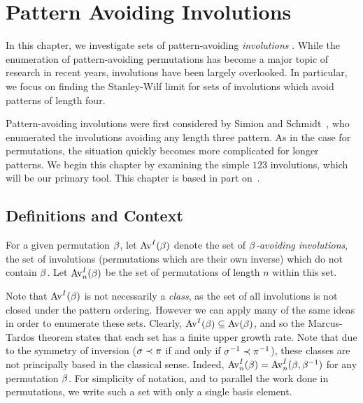 \chapter{Pattern Avoiding Involutions} 
\label{chap:involutions}

  In this chapter, we investigate sets of pattern-avoiding \emph{involutions}
  . While the enumeration of pattern-avoiding permutations
  has become a major topic of research in recent years, involutions have been
  largely overlooked.  In particular, we focus on finding the Stanley-Wilf
  limit for sets of involutions which avoid patterns of length four. 
  
  Pattern-avoiding involutions were first considered by Simion and
  Schmidt~\cite{Simion1985}, who enumerated the involutions avoiding any length 
  three pattern. As in the case for permutations, the situation quickly becomes
  more complicated for longer patterns. 
  We begin this chapter by examining the simple $123$
  involutions, which will be our primary tool. This chapter is based in part
  on~\cite{me-involutions}. 
  



  
  

\section{Definitions and Context}
\label{involutions:sec:intro}

  \begin{definition}\label{involutions:def:invclass}
    For a given permutation $\beta$, let $\operatorname{{Av}}^I(\beta)$ denote the set of
    \emph{$\beta$-avoiding involutions}, the set of involutions (permutations
    which are their own inverse) which do not contain $\beta$. 
    Let $\operatorname{{Av}}_n^I (\beta)$ be the set of permutations of length $n$ within this set. 
  \end{definition}

  Note that $\operatorname{{Av}}^I(\beta)$ is not necessarily a \emph{class}, as the set of all
  involutions is not closed under the pattern ordering. However we can apply
  many of the same ideas in order to enumerate these sets.  Clearly, $\operatorname{{Av}}^I
  (\beta) \subseteq \operatorname{{Av}}(\beta)$, and so the Marcus-Tardos theorem states that
  each set has a finite upper growth rate. Note that due to the symmetry of
  inversion ($\sigma \prec \pi$ if and only if $\sigma^{-1} \prec \pi^{-1}$), these
  classes are not principally based in the classical sense. Indeed,
  $\operatorname{{Av}}_n^I(\beta) = \operatorname{{Av}}_n^I(\beta, \beta^{-1})$ for any permutation $\beta$. For
  simplicity of notation, and to parallel the work done in permutations, we
  write such a set with only a single basis element. 


